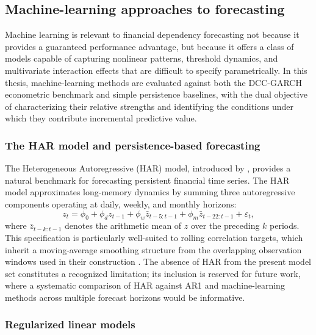 \subsection{Machine-learning approaches to forecasting}

Machine learning is relevant to financial dependency forecasting not because it provides a guaranteed performance advantage, but because it offers a class of models capable of capturing nonlinear patterns, threshold dynamics, and multivariate interaction effects that are difficult to specify parametrically. In this thesis, machine-learning methods are evaluated against both the DCC-GARCH econometric benchmark and simple persistence baselines, with the dual objective of characterizing their relative strengths and identifying the conditions under which they contribute incremental predictive value.

\subsubsection{The HAR model and persistence-based forecasting}

The Heterogeneous Autoregressive (HAR) model, introduced by \textcite{corsi2009har}, provides a natural benchmark for forecasting persistent financial time series. The HAR model approximates long-memory dynamics by summing three autoregressive components operating at daily, weekly, and monthly horizons:
\begin{equation}
    z_t = \phi_0 + \phi_d z_{t-1} + \phi_w \bar{z}_{t-5:t-1}
          + \phi_m \bar{z}_{t-22:t-1} + \varepsilon_t,
\end{equation}
where $\bar{z}_{t-k:t-1}$ denotes the arithmetic mean of $z$ over the preceding $k$ periods. This specification is particularly well-suited to rolling correlation targets, which inherit a moving-average smoothing structure from the overlapping observation windows used in their construction \cite{andersen2003realized}. The absence of HAR from the present model set constitutes a recognized limitation; its inclusion is reserved for future work, where a systematic comparison of HAR against AR1 and machine-learning methods across multiple forecast horizons would be informative.

\subsubsection{Regularized linear models}


